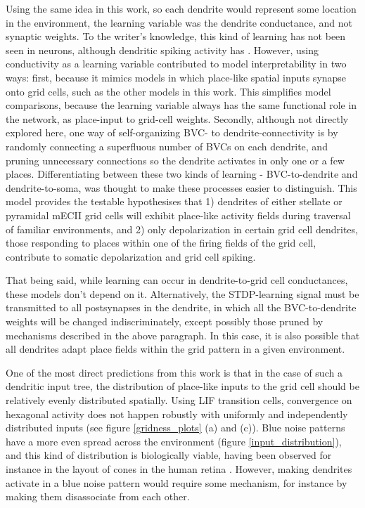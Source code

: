 \documentclass{article}
\begin{document}
    Using the same idea in this work, so each dendrite would represent some location in the environment, the learning variable was the dendrite conductance, and not synaptic weights. To the writer's knowledge, this kind of learning has not been seen in neurons, although dendritic spiking activity has \parencite{Castanares2020}. However, using conductivity as a learning variable contributed to model interpretability in two ways: first, because it mimics models in which place-like spatial inputs synapse onto grid cells, such as the other models in this work. This simplifies model comparisons, because the learning variable always has the same functional role in the network, as place-input to grid-cell weights. Secondly, although not directly explored here, one way of self-organizing BVC- to dendrite-connectivity is by randomly connecting a superfluous number of BVCs on each dendrite, and pruning unnecessary connections so the dendrite activates in only one or a few places. Differentiating between these two kinds of learning - BVC-to-dendrite and dendrite-to-soma, was thought to make these processes easier to distinguish. 
    This model provides the testable hypothesises that 1) dendrites of either stellate or pyramidal mECII grid cells will exhibit place-like activity fields during traversal of familiar environments, and 2) only depolarization in certain grid cell dendrites, those responding to places within one of the firing fields of the grid cell, contribute to somatic depolarization and grid cell spiking.

    That being said, while learning can occur in dendrite-to-grid cell conductances, these models don't depend on it. Alternatively, the STDP-learning signal must be transmitted to all postsynapses in the dendrite, in which all the BVC-to-dendrite weights will be changed indiscriminately, except possibly those pruned by mechanisms described in the above paragraph. In this case, it is also possible that all dendrites adapt place fields within the grid pattern in a given environment.

    One of the most direct predictions from this work is that in the case of such a dendritic input tree, the distribution of place-like inputs to the grid cell should be relatively evenly distributed spatially. Using LIF transition cells, convergence on hexagonal activity does not happen robustly with uniformly and independently distributed inputs (see figure \ref{gridness_plots} (a) and (c)). Blue noise patterns have a more even spread across the environment (figure \ref{input_distribution}), and this kind of distribution is biologically viable, having been observed for instance in the layout of cones in the human retina \parencite{Yellott1983}. However, making dendrites activate in a blue noise pattern would require some mechanism, for instance by making them disassociate from each other.
\end{document}
